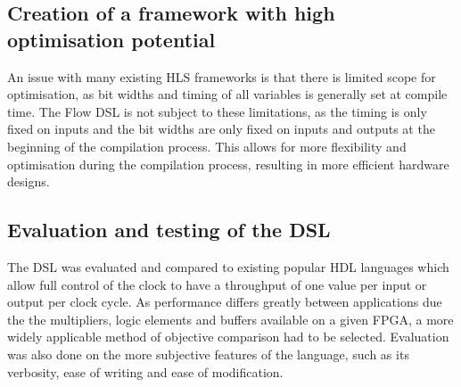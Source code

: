 \subsection*{Creation of a framework with high optimisation potential}
An issue with many existing HLS frameworks is that there is limited scope for optimisation, as bit widths and timing of all variables is generally set at compile time. The Flow DSL is not subject to these limitations, as the timing is only fixed on inputs and the bit widths are only fixed on inputs and outputs at the beginning of the compilation process. This allows for more flexibility and optimisation during the compilation process, resulting in more efficient hardware designs.

\subsection*{Evaluation and testing of the DSL}
The DSL was evaluated and compared to existing popular HDL languages which allow full control of the clock to have a throughput of one value per input or output per clock cycle. As performance differs greatly between applications due the the multipliers, logic elements and buffers available on a given FPGA, a more widely applicable method of objective comparison had to be selected. Evaluation was also done on the more subjective features of the language, such as its verbosity, ease of writing and ease of modification.